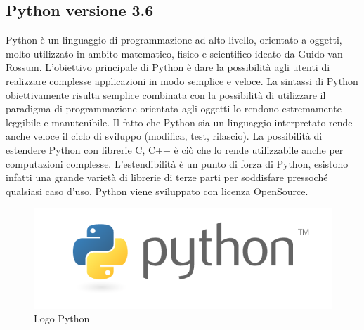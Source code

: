     \subsection{Python versione 3.6}\label{python}
    Python è un linguaggio di programmazione ad alto livello, orientato a oggetti, molto utilizzato
    in ambito matematico, fisico e scientifico ideato da Guido van Rossum\cite{10.5555/1593511}. L'obiettivo principale di Python
    è dare la possibilità agli utenti di realizzare complesse applicazioni in modo semplice e veloce.
    La sintassi di Python obiettivamente risulta semplice combinata con la possibilità di utilizzare
    il paradigma di programmazione orientata agli oggetti lo rendono estremamente leggibile e manutenibile.
    Il fatto che Python sia un linguaggio interpretato rende anche veloce il ciclo di sviluppo (modifica, test, rilascio).
    La possibilità di estendere Python con librerie C, C++ è ciò che lo rende utilizzabile anche per computazioni
    complesse. L'estendibilità è un punto di forza di Python, esistono infatti una grande varietà
    di librerie di terze parti per soddisfare pressoché qualsiasi caso d'uso.
    Python viene sviluppato con licenza OpenSource.
    \begin{figure}[H]
        \centering
        \includegraphics[width=\linewidth]{figure/python.png}
        \caption{Logo Python}
    \end{figure}

